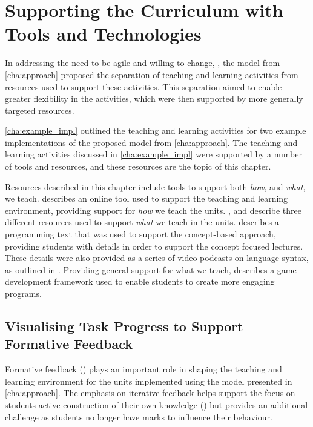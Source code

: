 
\chapter{Supporting the Curriculum with Tools and Technologies} %
\label{cha:supporting}

\graphicspath{{Figures/Supporting/}}

In addressing the need to be agile and willing to change, , the model from \cref{cha:approach} proposed the separation of teaching and learning activities from resources used to support these activities. This separation aimed to enable greater flexibility in the activities, which were then supported by more generally targeted resources.

\cref{cha:example_impl} outlined the teaching and learning activities for two example implementations of the proposed model from \cref{cha:approach}. The teaching and learning activities discussed in \cref{cha:example_impl} were supported by a number of tools and resources, and these resources are the topic of this chapter.

Resources described in this chapter include tools to support both \emph{how}, and \emph{what}, we teach.  describes an online tool used to support the teaching and learning environment, providing support for \emph{how} we teach the units. ,  and  describe three different resources used to support \emph{what} we teach in the units.  describes a programming text that was used to support the concept-based approach, providing students with details in order to support the concept focused lectures. These details were also provided as a series of video podcasts on language syntax, as outlined in . Providing general support for what we teach,  describes a game development framework used to enable students to create more engaging programs.


\section{Visualising Task Progress to Support Formative Feedback} %
\label{sec:doubtfire}

Formative feedback () plays an important role in shaping the teaching and learning environment for the units implemented using the model presented in \cref{cha:approach}. The emphasis on iterative feedback helps support the focus on students active construction of their own knowledge 
() but provides an additional challenge as students no longer have marks to influence their behaviour. 

